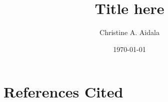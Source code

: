 \documentclass[letterpaper,12pt,prl,tightenlines,onecolumn,notitlepage,longbibliography,floatfix,nofootinbib]{revtex4-2}
\begin{document}
%
%
\title{Title here}
\date{\today}
\author{Christine A. Aidala}
\maketitle
\newpage
{}

\newpage
\setcounter{page}{0}

\cleardoublepage
%
\cleardoublepage
%
\cleardoublepage
\section{References Cited}

\cleardoublepage
%
%
\end{document}
